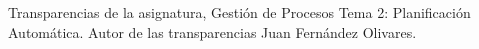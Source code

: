 % 

\begin{thebibliography}{99}

\emph{}Transparencias de la asignatura, Gesti\'on de Procesos Tema 2: Planificaci\'on Autom\'atica. Autor de las transparencias Juan Fern\'andez Olivares.

\end{thebibliography}
